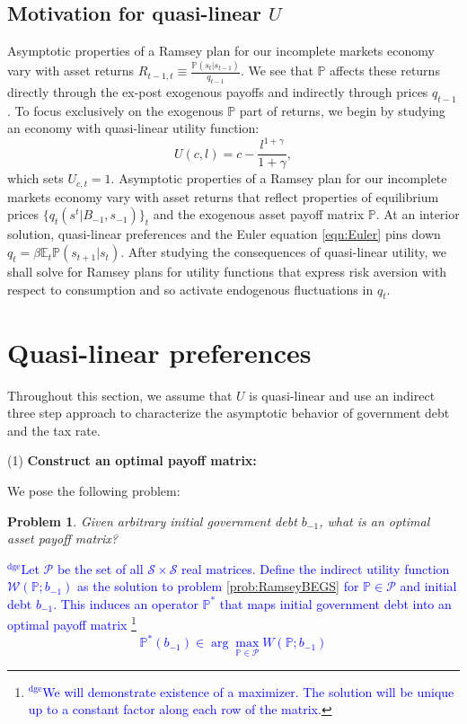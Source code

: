 \documentclass[12pt]{article}
\newcommand{\dge}[1]{\textcolor{blue}{$^{\textrm{dge}}${#1}}}
\newtheorem{problem}[theorem]{Problem}
\begin{document}
\subsection{Motivation for  quasi-linear $U$\label{sec:excusequasilinear}}
Asymptotic properties of a Ramsey plan for our incomplete markets economy vary  with asset returns $R_{t-1,t}\equiv \frac{\mathbb{P}(s_{t}|s_{t-1})}{q_{t-1}}$. We see that $\mathbb{P}$ affects these returns directly through the ex-post exogenous payoffs and indirectly through prices $q_{t-1}$. To focus exclusively on the exogenous $\mathbb{P}$ part of returns, we begin  by studying an economy with  quasi-linear  utility function:
  \begin{equation}\label{eqn:UQL}
U(c,l)=c-\frac{l^{1+\gamma}}{1+\gamma},\end{equation} which sets $U_{c,t}= 1$.  Asymptotic properties of a Ramsey plan for our incomplete markets economy vary  with   asset returns that reflect
	properties of equilibrium prices $\{q_t(s^t|B_{-1},s_{-1})\}_t$ and the exogenous asset payoff matrix $\mathbb{P}$.
At an interior solution, quasi-linear preferences and the Euler equation \eqref{eqn:Euler} pins down $q_t=\beta \mathbb{E}_t
\mathbb{P}(s_{t+1}|s_t)$.  After studying the consequences of quasi-linear utility, we shall solve for Ramsey plans for utility functions that express risk aversion with respect to consumption and so activate endogenous fluctuations in $q_t$.
	


\section{Quasi-linear preferences}

Throughout this section, we assume that $U$ is quasi-linear and use an indirect three step approach to  characterize  the asymptotic behavior of government  debt and the tax rate.



\noindent (1) \textbf{Construct  an optimal payoff matrix:}

We pose the following problem:
\begin{problem}\label{prob:PPoperator}
 Given arbitrary initial government debt $b_{-1}$, what is an optimal asset payoff matrix?
\end{problem}
\noindent  \dge{Let $\mathcal P$ be the set of all $\mathcal S\times \mathcal S$ real matrices.  Define the indirect utility function $\mathcal W(\mathbb P;b_{-1})$ as the solution to problem \ref{prob:RamseyBEGS} for $\mathbb P \in \mathcal P$ and initial debt $b_{-1}$.  This induces an operator $\mathbb P^*$ that maps initial government debt into an optimal payoff matrix \footnote{\dge{We will demonstrate existence of a maximizer.  The solution will be unique up to a constant factor along each row of the matrix.}}
\[
	\mathbb P^*(b_{-1}) \in \arg\max_{\mathbb P\in \mathcal P} W(\mathbb P; b_{-1})
\] }
\end{document}
